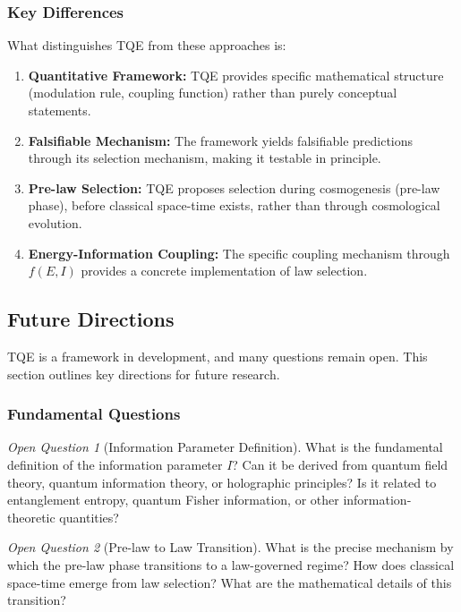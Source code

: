 \documentclass[12pt,a4paper]{article}
\theoremstyle{definition}
\theoremstyle{remark}
\newtheorem{question}{Open Question}[section]
\begin{document}
\subsubsection{Key Differences}

What distinguishes TQE from these approaches is:

\begin{enumerate}
\item \textbf{Quantitative Framework:} TQE provides specific mathematical structure (modulation rule, coupling function) rather than purely conceptual statements.

\item \textbf{Falsifiable Mechanism:} The framework yields falsifiable predictions through its selection mechanism, making it testable in principle.

\item \textbf{Pre-law Selection:} TQE proposes selection during cosmogenesis (pre-law phase), before classical space-time exists, rather than through cosmological evolution.

\item \textbf{Energy-Information Coupling:} The specific coupling mechanism through $f(E,I)$ provides a concrete implementation of law selection.
\end{enumerate}

\subsection{Future Directions}

TQE is a framework in development, and many questions remain open. This section outlines key directions for future research.

\subsubsection{Fundamental Questions}

\begin{question}[Information Parameter Definition]
What is the fundamental definition of the information parameter $I$? Can it be derived from quantum field theory, quantum information theory, or holographic principles? Is it related to entanglement entropy, quantum Fisher information, or other information-theoretic quantities?
\end{question}

\begin{question}[Pre-law to Law Transition]
What is the precise mechanism by which the pre-law phase transitions to a law-governed regime? How does classical space-time emerge from law selection? What are the mathematical details of this transition?
\end{question}
\end{document}
